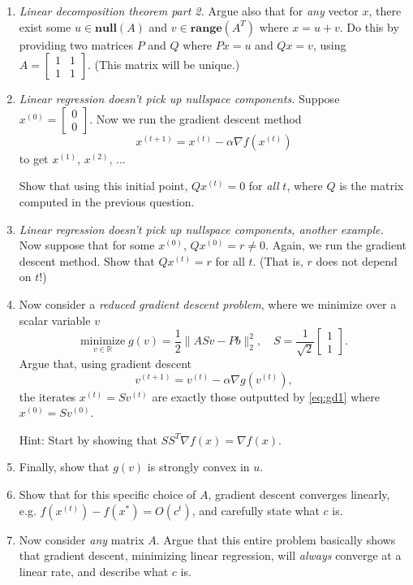 \documentclass{article}
\newcommand{\R}{\mathbb R}
\newcommand{\bmat}{\left[\begin{matrix}}
\newcommand{\emat}{\end{matrix}\right]}
\newcommand{\range}{\mathbf{range}}
\newcommand{\vnull}{\mathbf{null}}
\newcommand{\minimize}[1]{\underset{#1}{\text{minimize}}}
\begin{document}
\begin{enumerate}
\begin{enumerate}
\item 
\emph{Linear decomposition theorem part 2.}
Argue also that for \emph{any} vector $x$, there exist some $u\in \vnull(A)$ and $v\in \range(A^T)$ where $x = u+v$. Do this by providing two matrices $P$ and $Q$ where $Px = u$ and $Qx = v$, using   $A = \bmat 1 & 1 \\ 1 & 1 \emat$. (This matrix will be unique.)
 

\item \emph{Linear regression doesn't pick up nullspace components.} Suppose $x^{(0)} = \bmat 0 \\ 0 \emat$.   Now we run the gradient descent method
\begin{equation}
x^{(t+1)} = x^{(t)} - \alpha \nabla f(x^{(t)})
\label{eq:gd1}
\end{equation}
to get $x^{(1)}$, $x^{(2)}$, ...

Show that using this initial point,   $Qx^{(t)}=0$ for \emph{all} $t$, where $Q$ is the matrix computed in the previous question.

\item \emph{Linear regression doesn't pick up nullspace components, another example.} 
Now suppose that for some $x^{(0)}$, $Qx^{(0)} = r\neq 0$.  Again, we run the gradient descent method.
Show that $Qx^{(t)} = r$ for all $t$. (That is, $r$ does not depend on $t$!)





\item Now consider a \emph{reduced gradient descent problem}, where we minimize over a scalar variable $v$
\[
\minimize{v\in \R} \; g(v) = \frac{1}{2}\|ASv-Pb\|_2^2, \quad S = \frac{1}{\sqrt{2}}\bmat 1 \\ 1\emat.
\]
Argue that, using gradient descent
\[
v^{(t+1)} = v^{(t)} - \alpha \nabla g(v^{(t)}),
\]
the iterates $x^{(t)} = Sv^{(t)}$ are exactly those outputted by \eqref{eq:gd1} where $x^{(0)} = Sv^{(0)}$.

Hint: Start by showing that $SS^T\nabla f(x) = \nabla f(x)$.



\item Finally, show that $g(v)$ is strongly convex in $u$. 




\item Show that for this specific choice of $A$, gradient descent converges linearly, e.g. $f(x^{(t)}) - f(x^*) = O(c^t)$, and carefully state what $c$ is.




\item Now consider \emph{any} matrix $A$. Argue that this entire problem basically shows that gradient descent, minimizing linear regression, will \emph{always} converge at a linear rate, and describe what $c$ is.


\end{enumerate}



\end{enumerate}
\end{document}
